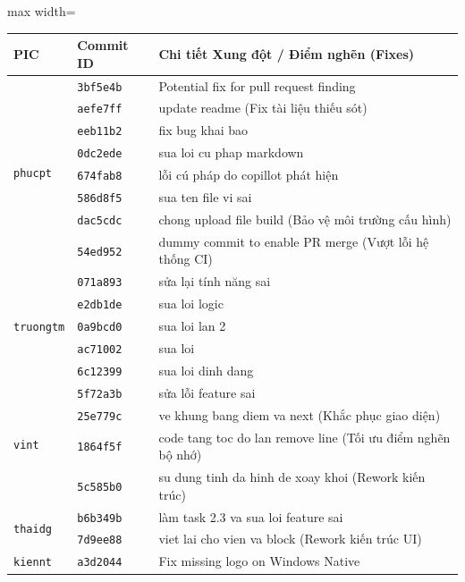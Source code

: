 \documentclass[12pt,a4paper]{article}
\begin{document}
\begin{table}[H]
\centering
\renewcommand{\arraystretch}{1.2}
\begin{adjustbox}{max width=\textwidth}
\begin{tabular}{|l|l|p{10cm}|}
\hline
\rowcolor{red!10}
\textbf{PIC} & \textbf{Commit ID} & \textbf{Chi tiết Xung đột / Điểm nghẽn (Fixes)} \\ \hline
\multirow{8}{*}{\texttt{phucpt}} 
& \texttt{3bf5e4b} & Potential fix for pull request finding \\ 
& \texttt{aefe7ff} & update readme (Fix tài liệu thiếu sót) \\ 
& \texttt{eeb11b2} & fix bug khai bao \\ 
& \texttt{0dc2ede} & sua loi cu phap markdown \\ 
& \texttt{674fab8} & lỗi cú pháp do copillot phát hiện \\ 
& \texttt{586d8f5} & sua ten file vi sai \\ 
& \texttt{dac5cdc} & chong upload file build (Bảo vệ môi trường cấu hình) \\ 
& \texttt{54ed952} & dummy commit to enable PR merge (Vượt lỗi hệ thống CI) \\ \hline
\multirow{5}{*}{\texttt{truongtm}} 
& \texttt{071a893} & sửa lại tính năng sai \\ 
& \texttt{e2db1de} & sua loi logic \\ 
& \texttt{0a9bcd0} & sua loi lan 2 \\ 
& \texttt{ac71002} & sua loi \\ 
& \texttt{6c12399} & sua loi dinh dang \\ \hline
\multirow{4}{*}{\texttt{vint}} 
& \texttt{5f72a3b} & sửa lỗi feature sai \\ 
& \texttt{25e779c} & ve khung bang diem va next (Khắc phục giao diện) \\ 
& \texttt{1864f5f} & code tang toc do lan remove line (Tối ưu điểm nghẽn bộ nhớ) \\ 
& \texttt{5c585b0} & su dung tinh da hinh de xoay khoi (Rework kiến trúc) \\ \hline
\multirow{2}{*}{\texttt{thaidg}} 
& \texttt{b6b349b} & làm task 2.3 va sua loi feature sai \\ 
& \texttt{7d9ee88} & viet lai cho vien va block (Rework kiến trúc UI) \\ \hline
\texttt{kiennt} 
& \texttt{a3d2044} & Fix missing logo on Windows Native \\ \hline
\end{tabular}
\end{adjustbox}
\end{table}
\end{document}
